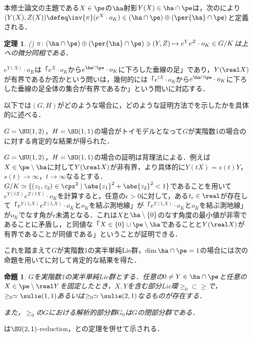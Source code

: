 \documentclass[12pt,dvipdfmx,uplatex]{jsarticle}
\newcounter{countabst}
\newtheorem{thm-a}[countabst]{定理}
\newtheorem{prop-a}[countabst]{命題}
\begin{document}
本修士論文の主題である$X\in \pe$の$\ha$射影$Y(X)\in \ha\cap \pe $は，次のにより${(Y(X), Z(X))\defeq \inv{\pi}(e^X\cdot o_K)\in (\ha\cap\pe)\oplus (\per{\ha}\cap \pe)}$と定義される．
\begin{thm-a}(\cite[Lemma~6.1]{kob89}\label{thm:kob89-lem6.1})
  $\pi\colon  (\ha\cap\pe)\oplus (\per{\ha}\cap \pe) \ni (Y, Z)\mapsto e^{Y}e^{Z}\cdot o_K \in G/K $は上への微分同相である．
\end{thm-a}

$e^{Y(X)}\cdot o_K$は「$e^{X}\cdot o_K$から$e^{\ha\cap\pe}\cdot o_K $に下ろした垂線の足」であり，$Y(\real X) $が有界であるか否かという問いは，幾何的には「$e^{tX}\cdot o_K$から$e^{\ha\cap\pe}\cdot o_K $に下ろした垂線の足全体の集合が有界であるか」という問いに対応する．

以下では$(G,H) $がどのような場合に，どのような証明方法でを示したかを具体的に述べる．

$G = \SU(1,2) $，$H= \SO(1,1)$の場合がトイモデルとなって$G$が実階数1の場合のに対する肯定的な結果が得られた．

$G = \SU(1,2) $，$H= \SO(1,1)$の場合の証明は背理法による．例えば$X\in \pe\setminus\ha $に対して$Y(\real X) $が非有界，より具体的に$Y(t X) = s(t) Y$，$s(t) \to \infty$，$t\to \infty $なるとする．$G/K \simeq \{(z_1,z_2)\in \cpx^2 \mid \abs{z_1}^2 + \abs{z_2}^2 < 1 \} $であることを用いて$e^{Y(tX)}e^{Z(tX)}\cdot o_K $を計算すると，任意の$\epsilon > 0$に対して，ある$t_{\epsilon}\in \real$が存在して「$ e^{Y(t_{\epsilon} X)}e^{Z(t_{\epsilon} X)}\cdot o_K $と$o_K$を結ぶ測地線」が「$e^{Y(t_{\epsilon} X)}\cdot o_K $と$o_K$を結ぶ測地線」が$o_K$でなす角が$\epsilon $未満となる．これは$X$と$\ha\setminus\{0\} $のなす角度の最小値が非零であることに矛盾し，と同値な「$X\in \{0\}\cup \pe\setminus\ha $であることと$ Y(\real X) $が有界であることが同値である」ということが証明できる．

これを踏まえて$G$が実階数1の実半単純Lie群，$\dim \ha\cap\pe =1 $の場合には次の命題を用いてに対して肯定的な結果を得た．

\begin{prop-a}\label{prop:reduction}
  $G$を実階数1の実半単純Lie群とする．任意の$0\neq Y\in \ha\cap\pe $と任意の$X\in \pe\setminus \real Y$を固定したとき，$X,Y$を含む部分Lie環$\ge_0\subset \ge$で，$\ge_0\simeq \sulie(1,1) $あるいは$\ge_0\simeq \sulie(2,1)$なるものが存在する．

  また，$\ge_0$の$G$における解析的部分群$G_0$は$G$の閉部分群である．
\end{prop-a}
は{$\SU(2,1) $-reduction}，\cite{hel01}と\cite{yos38}の定理を併せて示される．
\end{document}
